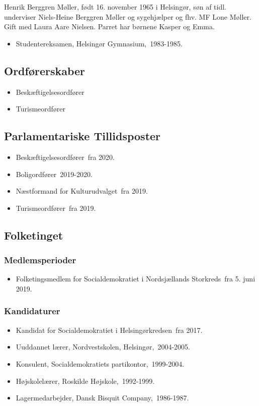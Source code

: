 \documentclass[11pt, a4paper]{awesome-cv}
\begin{document}
\makecvheader[R]
\makelettertitle
\begin{cvletter}
Henrik Berggren Møller, født 16. november 1965 i Helsingør, søn af tidl. underviser Niels-Heine Berggren Møller og sygehjælper og fhv. MF Lone Møller. Gift med Laura Aare Nielsen. Parret har børnene Kasper og Emma.

\begin{itemize}
\item Studentereksamen, Helsingør Gymnasium, 1983-1985.
\end{itemize}
\subsection*{Ordførerskaber}
\begin{itemize}
\item Beskæftigelsesordfører
\item Turismeordfører
\end{itemize}
\subsection*{Parlamentariske Tillidsposter}
\begin{itemize}
\item Beskæftigelsesordfører fra 2020.
\item Boligordfører 2019-2020.
\item Næstformand for Kulturudvalget fra 2019.
\item Turismeordfører fra 2019.
\end{itemize}
\subsection*{Folketinget}
\subsubsection*{Medlemsperioder}
\begin{itemize}
\item Folketingsmedlem for Socialdemokratiet i Nordsjællands Storkreds fra 5. juni 2019.
\end{itemize}
\subsubsection*{Kandidaturer}
\begin{itemize}
\item Kandidat for Socialdemokratiet i Helsingørkredsen fra 2017.
\end{itemize}
\begin{itemize}
\item Uuddannet lærer, Nordvestskolen, Helsingør, 2004-2005.
\item Konsulent, Socialdemokratiets partikontor, 1999-2004.
\item Højskolelærer, Roskilde Højskole, 1992-1999.
\item Lagermedarbejder, Dansk Bisquit Company, 1986-1987.
\end{itemize}
\end{cvletter}
\end{document}
